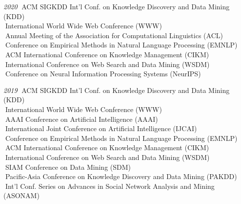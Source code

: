 \documentclass[10pt]{article}
\newenvironment{myindentpar}[1]%
{\begin{list}{}%
         {\setlength{\leftmargin}{#1}}%
         \item[]%
}
{\end{list}}
\newcounter{list}
\begin{document}
\begin{myindentpar}{0.75cm}
{\hspace{-0.75cm}\textit{2020}
\textcolor{white}{.}ACM SIGKDD Int'l Conf. on Knowledge Discovery and Data Mining (KDD) \\
\textcolor{white}{.}International World Wide Web Conference (WWW) \\
\textcolor{white}{.}Annual Meeting of the Association for Computational Linguistics (ACL) \\
\textcolor{white}{.}Conference on Empirical Methods in Natural Language Processing (EMNLP) \\
\textcolor{white}{.}ACM International Conference on Knowledge Management (CIKM) \\
\textcolor{white}{.}International Conference on Web Search and Data Mining (WSDM) \\
\textcolor{white}{.}Conference on Neural Information Processing Systems (NeurIPS)

\hspace{-0.75cm}\textit{2019}
\textcolor{white}{.}ACM SIGKDD Int'l Conf. on Knowledge Discovery and Data Mining (KDD) \\
\textcolor{white}{.}International World Wide Web Conference (WWW) \\
\textcolor{white}{.}AAAI Conference on Artificial Intelligence (AAAI) \\
\textcolor{white}{.}International Joint Conference on Artificial Intelligence (IJCAI) \\
\textcolor{white}{.}Conference on Empirical Methods in Natural Language Processing (EMNLP) \\
\textcolor{white}{.}ACM International Conference on Knowledge Management (CIKM) \\
\textcolor{white}{.}International Conference on Web Search and Data Mining (WSDM) \\
\textcolor{white}{.}SIAM Conference on Data Mining (SDM) \\
\textcolor{white}{.}Pacific-Asia Conference on Knowledge Discovery and Data Mining (PAKDD) \\
\textcolor{white}{.}Int'l Conf. Series on Advances in Social Network Analysis and Mining (ASONAM)
	
}
\end{myindentpar}
\end{document}
